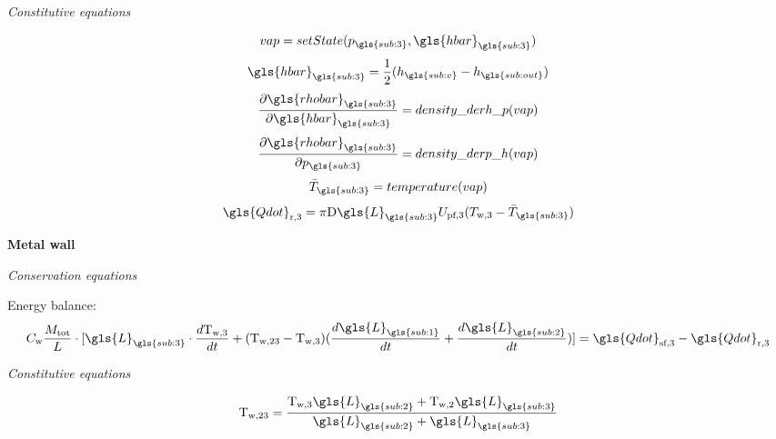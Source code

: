 \begin{center}
\textit{Constitutive equations}\\
\end{center}

\begin{equation}
vap = setState(p_{\gls{sub:3}},\gls{hbar}_{\gls{sub:3}})
\end{equation}
\begin{equation}
\gls{hbar}_{\gls{sub:3}} = \frac{1}{2}(h_{\gls{sub:v}} - h_{\gls{sub:out}})
\end{equation}
\begin{equation}
\frac{\partial \gls{rhobar}_{\gls{sub:3}}}{\partial \gls{hbar}_{\gls{sub:3}}}= density\_derh\_p(vap)
\end{equation}
\begin{equation}
\frac{\partial \gls{rhobar}_{\gls{sub:3}}}{\partial p_{\gls{sub:3}}}= density\_derp\_h(vap)
\end{equation}
\begin{equation}
\bar{T}_{\gls{sub:3}} = temperature(vap)
\end{equation}
\begin{equation}
\gls{Qdot}_\text{r,3} = \pi \text{D} \gls{L}_{\gls{sub:3}} U_\text{pf,3} (T_\text{w,3} - \bar{T}_{\gls{sub:3}})
\end{equation}

{\bf Metal wall}\\
\begin{center}
\textit{Conservation equations}
\end{center}
Energy balance:
\begin{equation}
C_\text{w}\frac{M_\text{tot}}{L} \cdot [ \gls{L}_{\gls{sub:3}} \cdot  \frac{d \text{T}_\text{w,3}}{d t} + (\text{T}_\text{w,23} - \text{T}_\text{w,3})  (\frac{d \gls{L}_{\gls{sub:1}}}{d t} + \frac{d \gls{L}_{\gls{sub:2}}}{d t})]= \gls{Qdot}_\text{sf,3} - \gls{Qdot}_\text{r,3}
\end{equation}

\begin{center}
\textit{Constitutive equations}
\end{center}

\begin{equation}
\text{T}_\text{w,23} = \frac{   \text{T}_\text{w,3} \gls{L}_{\gls{sub:2}}  + \text{T}_\text{w,2}\gls{L}_{\gls{sub:3}}      }{  \gls{L}_{\gls{sub:2}} + \gls{L}_{\gls{sub:3}}         } 
\end{equation}
